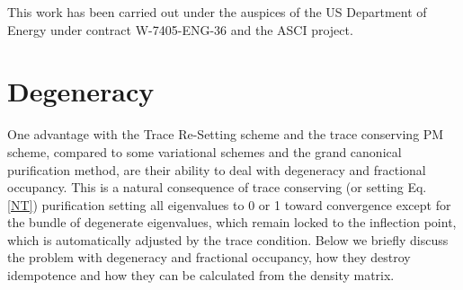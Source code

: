 \commentoutA{\documentclass[prb,aps,twocolumn,showpacs,twocolumngrid,superbib]{revtex4}}
\begin{document}
\begin{acknowledgments}
This work has been carried out under the auspices of the US Department 
of Energy under contract W-7405-ENG-36 and the ASCI project.  
\end{acknowledgments}




\appendix

\section{Degeneracy}\label{Degen}

One advantage with the Trace Re-Setting scheme and the trace
conserving PM scheme, compared to some variational schemes \cite{XLi93}
and the grand canonical purification method,
are their ability to deal with degeneracy and fractional occupancy.
This is a natural consequence of trace conserving (or setting Eq. \ref{NT}) purification
setting all eigenvalues to 0 or 1 toward convergence except for the bundle of 
degenerate eigenvalues, which remain locked to the inflection point, which
is automatically adjusted by the trace condition.
Below we briefly discuss the problem with degeneracy and fractional
occupancy, how they destroy idempotence and how they can be calculated
from the density matrix.
\end{document}
